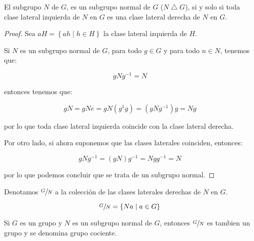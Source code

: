         \begin{lema}
            El subgrupo $N$ de $G$, es un subgrupo normal de $G$ ($N \bigtriangleup G$), si y solo si toda clase lateral izquierda de $N$ en $G$ es una clase lateral derecha de $N$ en $G$.
        \end{lema}

        \begin{proof}
            Sea $aH = \left\{ ah \mid h \in H \right\}$ la clase lateral izquierda de $H$.

            Si $N$ es un subgrupo normal de $G$, para todo $g \in G$ y para todo $n \in N$, tenemos que:

            \begin{equation*}
                gNg^{-1} = N
            \end{equation*}

            entonces tenemos que:

            \begin{equation*}
                gN = gNe = gN \left( g^{1} g \right) = \left( gNg^{-1} \right) g = N g
            \end{equation*}

            por lo que toda clase lateral izquierda coincide con la clase lateral derecha.

            Por otro lado, si ahora suponemos que las clases laterales coinciden, entonces:

            \begin{equation*}
                gNg^{-1} = \left( gN \right) g^{-1} = Ng g^{-1} = N
            \end{equation*}

            por lo que podemos concluir que se trata de un subgrupo normal.
        \end{proof}

        \begin{definicion}
            Denotamos $\sfrac{G}{N}$ a la colección de las clases laterales derechas de $N$ en $G$.

            \begin{equation}
                \sfrac{G}{N} = \left\{ Na \mid a \in G \right\}
            \end{equation}
        \end{definicion}

        \begin{teorema}
            Si $G$ es un grupo y $N$ es un subgrupo normal de $G$, entonces $\sfrac{G}{N}$ es tambien un grupo y se denomina grupo cociente.
        \end{teorema}


